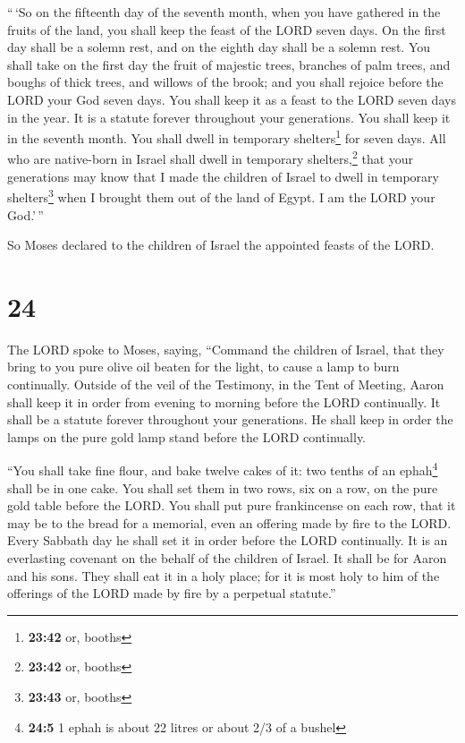  ``\,`So on the fifteenth day of the seventh month, when
you have gathered in the fruits of the land, you shall keep the feast of
the LORD seven days. On the first day shall be a solemn rest, and on the
eighth day shall be a solemn rest.  You shall take on the
first day the fruit of majestic trees, branches of palm trees, and
boughs of thick trees, and willows of the brook; and you shall rejoice
before the LORD your God seven days.  You shall keep it
as a feast to the LORD seven days in the year. It is a statute forever
throughout your generations. You shall keep it in the seventh month.
 You shall dwell in temporary shelters\footnote{\textbf{23:42}
  or, booths} for seven days. All who are native-born in Israel shall
dwell in temporary shelters,\footnote{\textbf{23:42} or, booths}
 that your generations may know that I made the children
of Israel to dwell in temporary shelters\footnote{\textbf{23:43} or,
  booths} when I brought them out of the land of Egypt. I am the LORD
your God.'\,''

 So Moses declared to the children of Israel the
appointed feasts of the LORD.

\hypertarget{section-23}{%
\section{24}\label{section-23}}

 The LORD spoke to Moses, saying,  ``Command
the children of Israel, that they bring to you pure olive oil beaten for
the light, to cause a lamp to burn continually.  Outside
of the veil of the Testimony, in the Tent of Meeting, Aaron shall keep
it in order from evening to morning before the LORD continually. It
shall be a statute forever throughout your generations. 
He shall keep in order the lamps on the pure gold lamp stand before the
LORD continually.

 ``You shall take fine flour, and bake twelve cakes of it:
two tenths of an ephah\footnote{\textbf{24:5} 1 ephah is about 22 litres
  or about 2/3 of a bushel} shall be in one cake.  You
shall set them in two rows, six on a row, on the pure gold table before
the LORD.  You shall put pure frankincense on each row,
that it may be to the bread for a memorial, even an offering made by
fire to the LORD.  Every Sabbath day he shall set it in
order before the LORD continually. It is an everlasting covenant on the
behalf of the children of Israel.  It shall be for Aaron
and his sons. They shall eat it in a holy place; for it is most holy to
him of the offerings of the LORD made by fire by a perpetual statute.''

